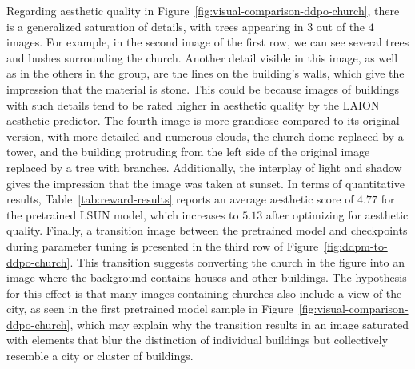 \noindent Regarding aesthetic quality in Figure~\ref{fig:visual-comparison-ddpo-church}, there is a generalized saturation of details, with trees appearing in $3$ out of the $4$ images. For example, in the second image of the first row, we can see several trees and bushes surrounding the church. Another detail visible in this image, as well as in the others in the group, are the lines on the building's walls, which give the impression that the material is stone. This could be because images of buildings with such details tend to be rated higher in aesthetic quality by the LAION aesthetic predictor. The fourth image is more grandiose compared to its original version, with more detailed and numerous clouds, the church dome replaced by a tower, and the building protruding from the left side of the original image replaced by a tree with branches. Additionally, the interplay of light and shadow gives the impression that the image was taken at sunset. In terms of quantitative results, Table~\ref{tab:reward-results} reports an average aesthetic score of $4.77$ for the pretrained LSUN model, which increases to $5.13$ after optimizing for aesthetic quality. Finally, a transition image between the pretrained model and checkpoints during parameter tuning is presented in the third row of Figure~\ref{fig:ddpm-to-ddpo-church}. This transition suggests converting the church in the figure into an image where the background contains houses and other buildings. The hypothesis for this effect is that many images containing churches also include a view of the city, as seen in the first pretrained model sample in Figure~\ref{fig:visual-comparison-ddpo-church}, which may explain why the transition results in an image saturated with elements that blur the distinction of individual buildings but collectively resemble a city or cluster of buildings. \\

